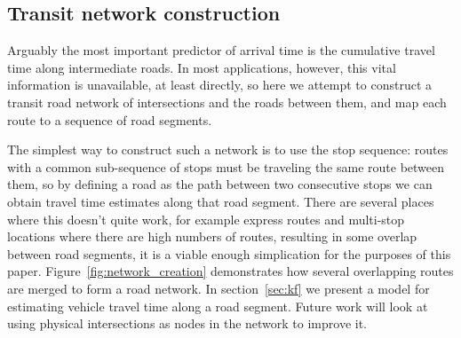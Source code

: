 \subsection{Transit network construction}
\label{sec:network_build}

Arguably the most important predictor of arrival time is
the cumulative travel time along intermediate roads.
In most applications, however, this vital information is unavailable,
at least directly,
so here we attempt to construct a transit road network of intersections
and the roads between them, 
and map each route to a sequence of road segments.


The simplest way to construct such a network is to use the stop sequence:
routes with a common sub-sequence of stops must be traveling the same route between them,
so by defining a road as the path between two consecutive stops 
we can obtain travel time estimates along that road segment.
There are several places where this doesn't quite work, for example express routes 
and multi-stop locations where there are high numbers of routes,
resulting in some overlap between road segments,
it is a viable enough simplication for the purposes of this paper.
Figure~\ref{fig:network_creation} demonstrates how several overlapping routes 
are merged to form a road network.
In section~\ref{sec:kf} we present a model for estimating vehicle travel time
along a road segment.
Future work will look at using physical intersections as nodes in the network to improve it.

